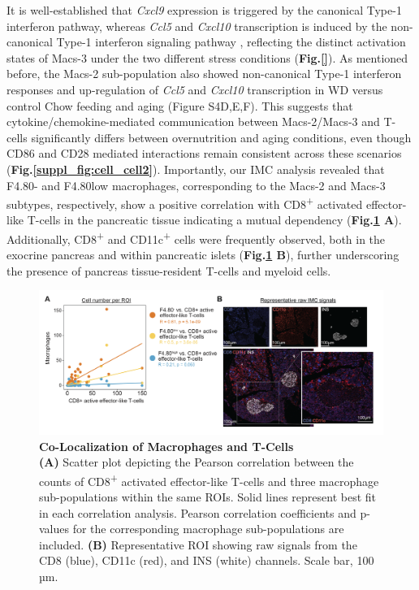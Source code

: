 It is well-established that \textit{Cxcl9} expression is triggered by the canonical Type-1 interferon pathway, whereas \textit{Ccl5} and \textit{Cxcl10} transcription is induced by the non-canonical Type-1 interferon signaling pathway \textbf{\cite{REF}}, reflecting the distinct activation states of Macs-3 under the two different stress conditions (\textbf{Fig.\ref{}}). As mentioned before, the Macs-2 sub-population also showed non-canonical Type-1 interferon responses and up-regulation of \textit{Ccl5} and \textit{Cxcl10} transcription in WD versus control Chow feeding and aging (Figure S4D,E,F). This suggests that cytokine/chemokine-mediated communication between Macs-2/Macs-3 and T-cells significantly differs between overnutrition and aging conditions, even though CD86 and CD28 mediated interactions remain consistent across these scenarios (\textbf{Fig.\ref{suppl_fig:cell_cell2}}). Importantly, our IMC analysis revealed that F4.80- and F4.80low macrophages, corresponding to the Macs-2 and Macs-3 subtypes, respectively, show a positive correlation with CD8\textsuperscript{+} activated effector-like T-cells in the pancreatic tissue indicating a mutual dependency (\textbf{Fig.\ref{fig2-8} A}). Additionally, CD8\textsuperscript{+} and CD11c\textsuperscript{+} cells were frequently observed, both in the exocrine pancreas and within pancreatic islets (\textbf{Fig.\ref{fig2-8} B}), further underscoring the presence of pancreas tissue-resident T-cells and myeloid cells.  


\begin{figure}[H]
\centering
\includegraphics[width=\linewidth]{Chapter4/Fig/F2-8-01.png}
\caption[res-cci-imc]{\textbf{Co-Localization of Macrophages and T-Cells}\\
\textbf{(A)} Scatter plot depicting the Pearson correlation between the counts of CD8\textsuperscript{+} activated effector-like T-cells and three macrophage sub-populations within the same ROIs. Solid lines represent best fit in each correlation analysis. Pearson correlation coefficients and p-values for the corresponding macrophage sub-populations are included. \textbf{(B)} Representative ROI showing raw signals from the CD8 (blue), CD11c (red), and INS (white) channels. Scale bar, 100 µm.}
\label{fig2-8}
\end{figure}





